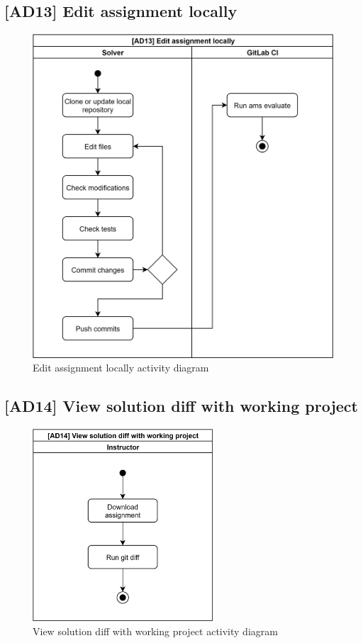 \subsection{{[}AD13{]} Edit assignment locally} \label{ssec:ad13}

\begin{figure}[H]
    \centering
    \includegraphics[width=\textwidth,height=\textheight,keepaspectratio]{Figures/ad/ad16.png}
    \caption{Edit assignment locally activity diagram}
\end{figure}

\subsection{{[}AD14{]} View solution diff with working project} \label{ssec:ad14}

\begin{figure}[H]
    \centering
    \includegraphics[width=0.6\textwidth,height=\textheight,keepaspectratio]{Figures/ad/ad5.png}
    \caption{View solution diff with working project activity diagram}
\end{figure}

